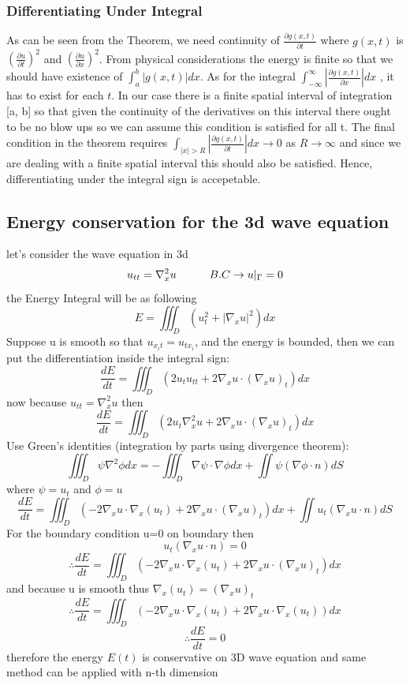 \documentclass[]{article}
\begin{document}
\subsubsection*{Differentiating Under Integral}
As can be seen from the Theorem, we need continuity of 
$\displaystyle \frac{\partial g(x, t)}{\partial t}$
where $g(x,t)$ is 
$\displaystyle {\left(\frac{\partial u}{\partial t}\right)}^2$
and
$\displaystyle {\left(\frac{\partial u}{\partial x}\right)}^2$. 
From physical considerations the energy is finite so that we should have existence of
$\displaystyle \int_{a}^{b} |g(x,t)|dx$. As for the integral
$\displaystyle \int_{-\infty}^{\infty} \left|\frac{\partial g(x,t)}{\partial x}\right|dx$
, it has to exist for each $t$. In our case there is a finite spatial interval of integration
[a, b] so that given the continuity of the derivatives on this interval there ought
to be no blow ups so we can assume this condition is satisfied for all t. 
The final condition in the theorem requires
$\displaystyle \int_{|x|>R} |\frac{\partial g(x,t)}{\partial t}| dx \to 0 $ as $R \to \infty$
and since we are dealing with a finite spatial interval this should also be satisfied.
Hence, differentiating under the integral sign is accepetable.

\subsection{Energy conservation for the 3d wave equation}
let's consider the wave equation in 3d
\[
u_{tt} = \nabla_x^2 u \quad\quad\quad B.C \to u|_{\Gamma} = 0
\]
the Energy Integral will be as following
\[
    E = \iiint_{D}(u_t^2 + |\nabla_x u|^2) dx
\]
Suppose u is smooth so that $u_{x_{i}t}=u_{t x_{i}}$, 
and the energy is bounded, then we can put the differentiation inside the integral sign:
\[
\frac{dE}{dt} = \iiint_{D}(  2 u_t u_{tt} + 2 \nabla_x u \cdot (\nabla_x u)_t) dx
\]
now because $u_{tt} = \nabla_x^2 u$ then
\[
    \frac{dE}{dt} = \iiint_{D}(  2 u_t \nabla_x^2 u + 2 \nabla_x u \cdot (\nabla_x u)_t) dx
\]
Use Green's identities (integration by parts using divergence theorem):
\[
    \iiint_{D} \psi \nabla^2 \phi dx = -\iiint_{D} \nabla \psi \cdot \nabla \phi dx + \iint \psi (\nabla \phi \cdot n )dS
\]
where $\psi = u_t $ and  $\phi = u$
\[
    \frac{dE}{dt} = \iiint_{D}( -2 \nabla_x u \cdot \nabla_x (u_t) + 2\nabla_x u \cdot (\nabla_x u)_t) dx  + \iint u_t(\nabla_x u \cdot n )dS
\]
For the boundary condition u=0 on boundary then 
\[
    u_t(\nabla_x u \cdot n ) = 0
\]
\[
  \therefore  \frac{dE}{dt} = \iiint_{D}( -2 \nabla_x u \cdot \nabla_x (u_t) + 2\nabla_x u \cdot (\nabla_x u)_t) dx
\]
and because u is smooth thus $\nabla_x (u_t) =(\nabla_x u)_t$
\[
  \therefore  \frac{dE}{dt} = \iiint_{D}( -2 \nabla_x u \cdot \nabla_x (u_t) + 2 \nabla_x u \cdot \nabla_x (u_t)) dx
\]
\[
    \therefore  \frac{dE}{dt} = 0
\]
therefore the energy $E(t)$ is conservative on 3D wave equation and same method can be applied with n-th dimension
\end{document}
